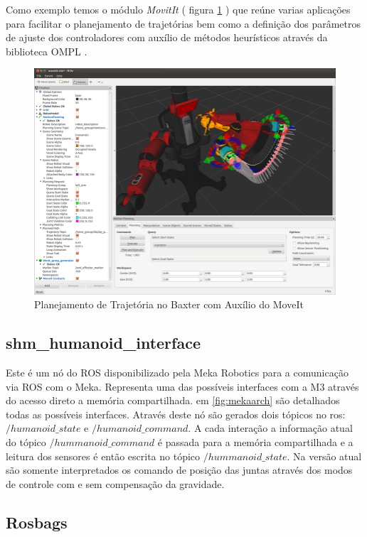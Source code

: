 Como exemplo temos o módulo \textit{MovitIt} ( figura \ref{fig:movit-baxter} ) que reúne varias aplicações para facilitar o planejamento de trajetórias bem como a definição dos parâmetros de ajuste dos controladores com auxílio de métodos heurísticos através da biblioteca OMPL \cite{openMPL}.

\begin{figure}[H]
    \centering
    \includegraphics[width=0.6\linewidth]{tex/figs/movit-ros-baxter.png}
    \caption{Planejamento de Trajetória no Baxter com Auxílio do MoveIt \cite{coleman2014reducing}}
    \label{fig:movit-baxter}
\end{figure}

\subsection{shm\_humanoid\_interface}

Este é um nó do ROS disponibilizado pela Meka Robotics para a comunicação via ROS com o Meka. Representa uma das possíveis interfaces com a M3 através do acesso direto a memória compartilhada. em \ref{fig:mekaarch} são detalhados todas as possíveis interfaces. Através deste nó são gerados dois tópicos no ros: $/humanoid\_state$ e $/humanoid\_command$. A cada interação a informação atual do tópico $/hummanoid\_command$ é passada para a memória compartilhada e a leitura dos sensores é então escrita no tópico $/hummanoid\_state$. Na versão atual são somente interpretados os comando de posição das juntas através dos modos de controle com e sem compensação da gravidade.

\subsection{Rosbags}

